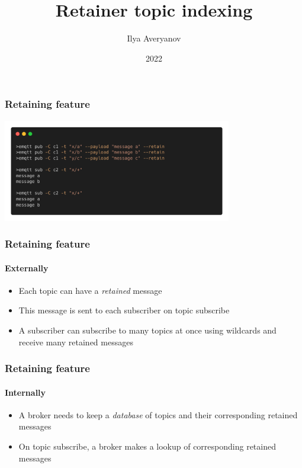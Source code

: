 \documentclass{beamer}
\title{Retainer topic indexing}
\author{Ilya Averyanov}
\institute{EMQX}
\date{2022}
\begin{document}
\frame{\titlepage}

\begin{frame}
    \frametitle{Retaining feature}

    \begin{center}
        \includegraphics[width=10cm, keepaspectratio]{images/retain-demo.png}
    \end{center}
\end{frame}

\begin{frame}
    \frametitle{Retaining feature}
    \framesubtitle{Externally}

    \begin{itemize}
        \item Each topic can have a \textit{retained} message
        \item This message is sent to each subscriber on topic subscribe
        \item A subscriber can subscribe to many topics at once using wildcards and receive many
        retained messages
    \end{itemize}
\end{frame}

\begin{frame}
    \frametitle{Retaining feature}
    \framesubtitle{Internally}

    \begin{itemize}
        \item A broker needs to keep a \textit{database} of topics and their corresponding retained messages
        \item On topic subscribe, a broker makes a lookup of corresponding retained messages
    \end{itemize}
\end{frame}
\end{document}
